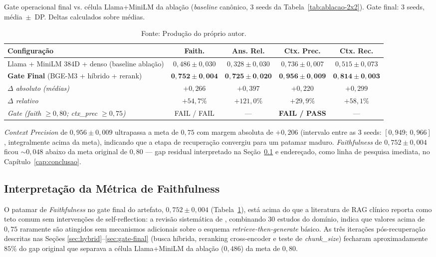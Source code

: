 \documentclass[
  12pt,
  oneside,
  a4paper,
  english,
  brazil
]{abntex2}
\begin{document}
\begin{table}[ht]
  \caption{Gate operacional final vs. célula Llama+MiniLM da ablação
           (\textit{baseline} canônico, 3 seeds da Tabela~\ref{tab:ablacao-2x2}).
           Gate final: 3 seeds, média~$\pm$~DP. Deltas calculados sobre médias.}
  \label{tab:gate-final}
  \begin{tabularx}{\textwidth}{@{}Xcccc@{}}
  \toprule
  \textbf{Configuração} &
  \textbf{Faith.} & \textbf{Ans. Rel.} &
  \textbf{Ctx. Prec.} & \textbf{Ctx. Rec.} \\
  \midrule
  Llama + MiniLM 384D + denso (baseline ablação)
        & $0{,}486 \pm 0{,}030$ & $0{,}328 \pm 0{,}030$ & $0{,}736 \pm 0{,}007$ & $0{,}515 \pm 0{,}073$ \\
  \textbf{Gate Final} (BGE-M3 + híbrido + rerank)
        & $\mathbf{0{,}752 \pm 0{,}004}$ & $\mathbf{0{,}725 \pm 0{,}020}$ & $\mathbf{0{,}956 \pm 0{,}009}$ & $\mathbf{0{,}814 \pm 0{,}003}$ \\
  \midrule
  \textit{$\Delta$ absoluto (médias)} &
    $+0{,}266$ & $+0{,}397$ & $+0{,}220$ & $+0{,}299$ \\
  \textit{$\Delta$ relativo} &
    $+54{,}7\%$ & $+121{,}0\%$ & $+29{,}9\%$ & $+58{,}1\%$ \\
  \textit{Gate (faith $\geq 0{,}80$; ctx\_prec $\geq 0{,}75$)} &
    FAIL / FAIL & — & \textbf{FAIL / PASS} & — \\
  \bottomrule
  \end{tabularx}
  \caption*{Fonte: Produção do próprio autor.}
\end{table}

\textit{Context Precision} de $0{,}956 \pm 0{,}009$ ultrapassa a meta de
$0{,}75$ com margem absoluta de $+0{,}206$ (intervalo entre as 3 seeds:
$[0{,}949;\, 0{,}966]$, integralmente acima da meta), indicando que a
etapa de recuperação convergiu para um patamar maduro.
\textit{Faithfulness} de $0{,}752 \pm 0{,}004$ ficou $\sim 0{,}048$
abaixo da meta original de $0{,}80$ --- gap residual interpretado na
Seção~\ref{sec:interp-faith} e endereçado, como linha de pesquisa imediata,
no Capítulo~\ref{cap:conclusao}.

\subsection{Interpretação da Métrica de Faithfulness}
\label{sec:interp-faith}

O patamar de \textit{Faithfulness} no gate final do artefato,
$0{,}752 \pm 0{,}004$ (Tabela~\ref{tab:gate-final}), está acima do que a
literatura de RAG clínico reporta como teto comum sem intervenções de
self-reflection: a revisão sistemática de \citeauthor{ocaf2024}
\cite{ocaf2024}, combinando 30 estudos do domínio, indica que valores acima
de $0{,}75$ raramente são atingidos sem mecanismos adicionais sobre o esquema
\textit{retrieve-then-generate} básico. As três iterações pós-recuperação
descritas nas Seções \ref{sec:hybrid}--\ref{sec:gate-final} (busca híbrida,
reranking cross-encoder e teste de \textit{chunk\_size}) fecharam
aproximadamente $85\%$ do gap original que separava a célula Llama+MiniLM
da ablação ($0{,}486$) da meta de $0{,}80$.
\end{document}
